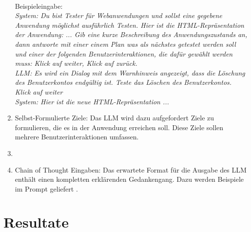 \begin{enumerate}
    \\
    Beispieleingabe:
    \\
    \textit{System: Du bist Tester für Webanwendungen und sollst eine gegebene Anwendung möglichst ausführlich Testen.
    Hier ist die HTML-Repräsentation der Anwendung: ... 
    Gib eine kurze Beschreibung des Anwendungszustands an, dann antworte mit einer einem Plan was als nächstes getestet werden soll und einer der folgenden Benutzerinteraktionen, die dafür gewählt werden muss: Klick auf \dq weiter\dq, Klick auf \dq zurück\dq. 
    \\
    LLM: Es wird ein Dialog mit dem Warnhinweis angezeigt, dass die Löschung des Benutzerkontos endgültig ist.
    Teste das Löschen des Benutzerkontos.
    Klick auf \dq weiter\dq
    \\
    System: Hier ist die neue HTML-Repräsentation ...
    }
    \item Selbst-Formulierte Ziele: Das LLM wird dazu aufgefordert Ziele zu formulieren, die es in der Anwendung erreichen soll. Diese Ziele sollen mehrere Benutzerinteraktionen umfassen.
    \item 
    \item Chain of Thought Eingaben: Das erwartete Format für die Ausgabe des LLM enthält einen kompletten erklärenden Gedankengang. Dazu werden Beispiele im Prompt geliefert \cite{chain-of-thought}.
\end{enumerate}

\section{Resultate}
\label{sec:vaildation}

\begin{figure}
    \centering
    
\end{figure}

